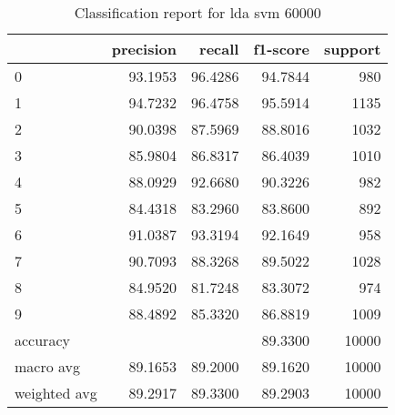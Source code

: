 \begin{table}[htb!]
\centering
\begin{tabular}{lrrrr}
    \toprule
    & precision & recall & f1-score & support \\
    \midrule
0 & 93.1953 & 96.4286 & 94.7844 & 980 \\
1 & 94.7232 & 96.4758 & 95.5914 & 1135 \\
2 & 90.0398 & 87.5969 & 88.8016 & 1032 \\
3 & 85.9804 & 86.8317 & 86.4039 & 1010 \\
4 & 88.0929 & 92.6680 & 90.3226 & 982 \\
5 & 84.4318 & 83.2960 & 83.8600 & 892 \\
6 & 91.0387 & 93.3194 & 92.1649 & 958 \\
7 & 90.7093 & 88.3268 & 89.5022 & 1028 \\
8 & 84.9520 & 81.7248 & 83.3072 & 974 \\
9 & 88.4892 & 85.3320 & 86.8819 & 1009 \\
accuracy & & & 89.3300 & 10000 \\
macro avg & 89.1653 & 89.2000 & 89.1620 & 10000 \\
weighted avg & 89.2917 & 89.3300 & 89.2903 & 10000 \\
\bottomrule
\end{tabular}
\caption{Classification report for lda svm 60000}
\label{tab:classification-report-lda_svm_60000}
\end{table}
